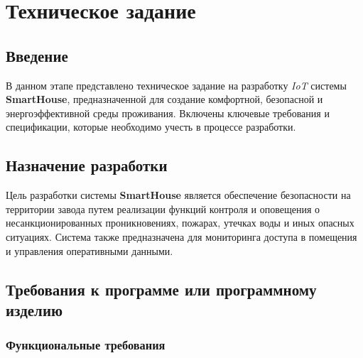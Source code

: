 \documentclass{article}
\begin{document}
\section{Техническое задание}

\subsection{Введение}
В данном этапе представлено техническое задание на разработку \textit{IoT} системы \textbf{SmartHouse}, предназначенной для создание комфортной, безопасной и энергоэффективной среды проживания. Включены ключевые требования и спецификации, которые необходимо учесть в процессе разработки.

\subsection{Назначение разработки}
Цель разработки системы \textbf{SmartHouse} является обеспечение безопасности на территории завода путем реализации функций контроля и оповещения о несанкционированных проникновениях, пожарах, утечках воды и иных опасных ситуациях. Система также предназначена для мониторинга доступа в помещения и управления оперативными данными.


\subsection{Требования к программе или программному изделию}

\subsubsection{Функциональные требования}
\end{document}
